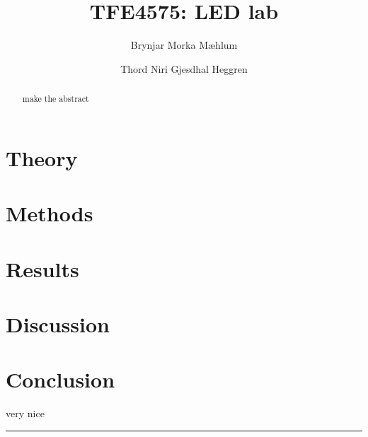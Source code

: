 \documentclass[5p,sort&compress]{elsarticle}
\begin{document}
\begin{frontmatter}

  \title{TFE4575: LED lab}

  \author[fysikk]{Brynjar Morka Mæhlum}
  \author[fysikk]{Thord Niri Gjesdhal Heggren}


  \address[fysikk]{Department of Physics, Norwegian University of Science and Technology, 7491 Trondheim, Norway.}

  \begin{abstract}

    \noindent make the abstract

  \end{abstract}


\end{frontmatter}

{ %
\hypersetup{linkcolor=purple}
\tableofcontents
}

\section{Theory}



\section{Methods}




\section{Results}


\section{Discussion}


\section{Conclusion}

\noindent very nice \cite{referanse_test}


\begingroup
\begin{center}
  \rule{2cm}{.4pt}
\end{center}
\makeatletter
{}
\makeatother



\endgroup
\end{document}

